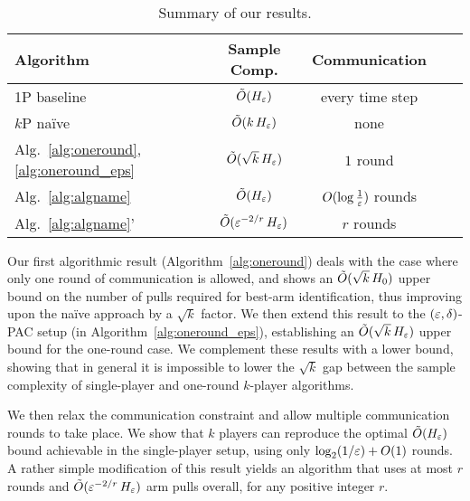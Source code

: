 \documentclass[12pt]{article}
\begin{document}
\setlength{\cellspacetoplimit}{2pt}
\setlength{\cellspacebottomlimit}{2pt}

\begin{table}[htdp]
\begin{center}
\begin{tabular}{|l||Sc|Sl|}
\hline
Algorithm & Sample Comp. & Communication  \\
\hline\hline
1P baseline & $\tilde{O}(H_\varepsilon)$ & every time step \\
\hline
$k$P na\"ive & $\tilde{O}(k \, H_\varepsilon)$ & none \\
\hline
Alg.~\ref{alg:oneround},\ref{alg:oneround_eps} & $\tilde{O}(\sqrt{k} \, H_\varepsilon)$ & $1$ round \\
\hline
Alg.~\ref{alg:algname} & $\tilde{O}(H_\varepsilon)$ & $O(\log \tfrac{1}{\varepsilon})$ rounds \\
\hline
Alg.~\ref{alg:algname}' & $\tilde{O}(\varepsilon^{-2/r} \, H_\varepsilon)$ & $r$ rounds \\
\hline
\end{tabular}
\end{center}
\caption{Summary of our results.} \label{tab:results}
\end{table}

Our first algorithmic result (Algorithm~\ref{alg:oneround}) deals with the case where only one round of communication is allowed, and shows an $\tilde{O}(\sqrt{k} \, H_0)$ upper bound on the number of pulls required for best-arm identification, thus improving upon the na\"{i}ve approach by a $\sqrt{k}$ factor.
We then extend this result to the $(\varepsilon,\delta)$-PAC setup (in Algorithm~\ref{alg:oneround_eps}), establishing an $\tilde{O}(\sqrt{k} \, H_\varepsilon)$ upper bound for the one-round case.
We complement these results with a lower bound, showing that in general it is
impossible to lower the $\sqrt{k}$ gap between the sample complexity
of single-player and one-round $k$-player algorithms.


We then relax the communication constraint and allow multiple
communication rounds to take place.
We show that $k$ players can reproduce the optimal $\tilde{O}(H_\varepsilon)$ bound achievable in the single-player setup, using only $\log_2(1/\varepsilon) + O(1)$ rounds.
A rather simple modification of this result yields an algorithm that uses at most $r$ rounds and $\tilde{O}(\varepsilon^{-2/r} \, H_\varepsilon)$ arm pulls overall, for any positive integer $r$.
\end{document}
